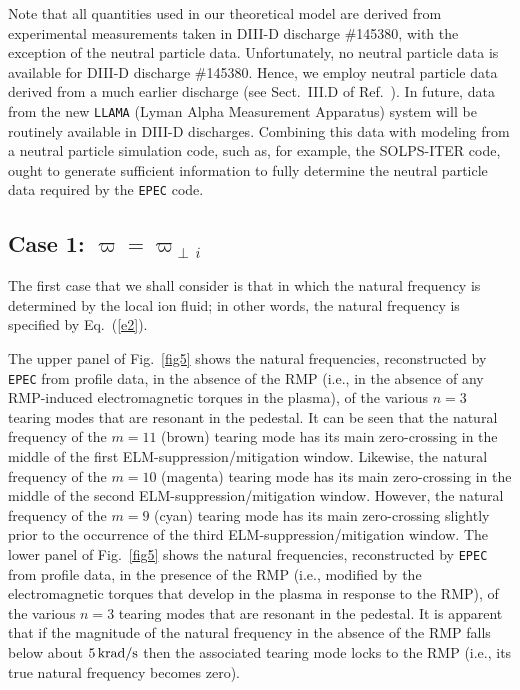 \documentclass[12pt,prb,aps]{revtex4-1}
\begin{document}
Note that all quantities used in our theoretical model are derived from experimental measurements taken in DIII-D discharge \#145380, with the exception of the neutral particle data. 
Unfortunately, no neutral particle data is available for DIII-D discharge \#145380.
Hence, we employ neutral particle data derived from a much earlier discharge (see Sect.~III.D of Ref.~).\cite{neutral}
In future, data from the new {\tt LLAMA} (Lyman Alpha Measurement Apparatus) system will be routinely available in DIII-D discharges.\cite{llama}
Combining this data  with modeling from a neutral particle simulation code, such as, for example, the  SOLPS-ITER code,\cite{solps} ought to generate sufficient information to fully determine the
neutral particle data required by the {\tt EPEC} code.  

\subsection{Case 1: $\varpi=\varpi_{\perp\,i}$}
The first case that we shall consider is that in which the natural frequency is determined by the local ion fluid; 
in other words, the natural frequency is specified by Eq.~(\ref{e2}). 

The upper panel of Fig.~\ref{fig5} shows the natural frequencies, reconstructed by {\tt EPEC} from profile data, in the absence of the RMP (i.e., in the absence of
any RMP-induced electromagnetic torques in the plasma), of the various  $n=3$ tearing modes 
 that are resonant in the pedestal. It can be seen that the natural frequency of the $m=11$ (brown) tearing mode has its main zero-crossing in the middle
of the first ELM-suppression/mitigation window. Likewise, the natural frequency of the $m=10$ (magenta) tearing mode has its main zero-crossing in the middle of the
second ELM-suppression/mitigation window. However, the natural frequency of the $m=9$ (cyan) tearing mode  has its main zero-crossing slightly
prior to the occurrence of the third ELM-suppression/mitigation window. The lower panel of Fig.~\ref{fig5} shows the natural frequencies, reconstructed by {\tt EPEC} from profile data, in the presence of the RMP (i.e., modified by the electromagnetic torques that develop in the plasma in response to the RMP), of the various $n=3$
tearing modes that are resonant in the pedestal. It is apparent that if the magnitude of the natural frequency in the absence of the RMP falls below about
$5\,{\rm krad/s}$ then the associated tearing mode locks to the RMP (i.e., its true natural frequency becomes zero). 
\end{document}

